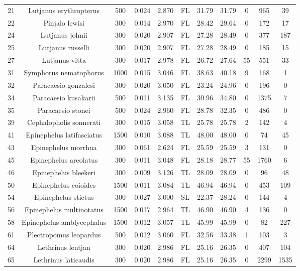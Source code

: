 \documentclass{report}\usepackage[]{graphicx}\usepackage[]{color}
\begin{document}
\begin{table}[ht]
{\begin{tabular}{ccccccccccc}
  21 & Lutjanus erythropterus & 500 & 0.024 & 2.870 & FL & 31.79 & 31.79 & 0 & 965 & 39 \\ 
  22 & Pinjalo lewisi & 300 & 0.014 & 2.970 & FL & 28.42 & 29.64 & 0 & 172 & 17 \\ 
  24 & Lutjanus johnii & 300 & 0.020 & 2.907 & FL & 27.28 & 28.49 & 0 & 377 & 187 \\ 
  25 & Lutjanus russelli & 300 & 0.020 & 2.907 & FL & 27.28 & 28.49 & 0 & 185 & 15 \\ 
  27 & Lutjanus vitta & 300 & 0.017 & 2.978 & FL & 26.72 & 27.64 & 55 & 551 & 33 \\ 
  31 & Symphorus nematophorus & 1000 & 0.015 & 3.046 & FL & 38.63 & 40.18 & 9 & 168 & 1 \\ 
  32 & Paracaesio gonzalesi & 300 & 0.020 & 3.050 & FL & 23.24 & 24.96 & 0 & 196 & 0 \\ 
  34 & Paracaesio kusakarii & 500 & 0.011 & 3.135 & FL & 30.96 & 34.80 & 0 & 1375 & 7 \\ 
  35 & Paracaesio stonei & 500 & 0.024 & 2.960 & FL & 28.78 & 32.35 & 0 & 486 & 0 \\ 
  39 & Cephalopholis sonnerati & 300 & 0.015 & 3.058 & TL & 25.78 & 25.78 & 2 & 142 & 4 \\ 
  41 & Epinephelus latifasciatus & 1500 & 0.010 & 3.088 & TL & 48.00 & 48.00 & 0 & 74 & 45 \\ 
  43 & Epinephelus morrhua & 300 & 0.061 & 2.624 & FL & 25.59 & 25.59 & 3 & 131 & 0 \\ 
  45 & Epinephelus areolatus & 300 & 0.011 & 3.048 & FL & 28.18 & 28.77 & 55 & 1760 & 6 \\ 
  46 & Epinephelus bleekeri & 300 & 0.009 & 3.126 & TL & 28.09 & 28.09 & 0 & 96 & 48 \\ 
  50 & Epinephelus coioides & 1500 & 0.011 & 3.084 & TL & 46.94 & 46.94 & 0 & 453 & 109 \\ 
  54 & Epinephelus stictus & 300 & 0.027 & 3.000 & SL & 22.37 & 28.24 & 0 & 144 & 4 \\ 
  56 & Epinephelus multinotatus & 1500 & 0.017 & 2.964 & TL & 46.90 & 46.90 & 4 & 136 & 0 \\ 
  58 & Epinephelus amblycephalus & 1500 & 0.012 & 3.057 & TL & 45.99 & 45.99 & 0 & 82 & 227 \\ 
  61 & Plectropomus leopardus & 500 & 0.012 & 3.060 & FL & 32.56 & 33.38 & 1 & 103 & 3 \\ 
  64 & Lethrinus lentjan & 300 & 0.020 & 2.986 & FL & 25.16 & 26.35 & 0 & 407 & 104 \\ 
  65 & Lethrinus laticaudis & 300 & 0.020 & 2.986 & FL & 25.16 & 26.35 & 0 & 2299 & 1535 \\ 

\end{tabular}}
\end{table}
\end{document}
